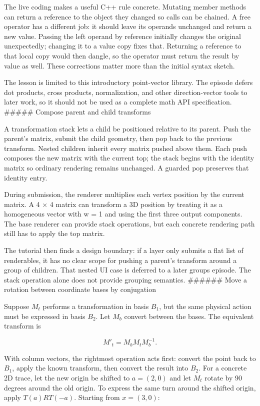 The live coding makes a useful C++ rule concrete. Mutating member methods can return a reference to the object they changed so calls can be chained. A free \BookInlineCode{+} operator has a different job: it should leave its operands unchanged and return a new value. Passing the left operand by reference initially changes the original unexpectedly; changing it to a value copy fixes that. Returning a reference to that local copy would then dangle, so the operator must return the result by value as well. These corrections matter more than the initial syntax sketch.

The lesson is limited to this introductory point-vector library. The episode defers dot products, cross products, normalization, and other direction-vector tools to later work, so it should not be used as a complete math API specification. \#\#\#\#\# Compose parent and child transforms

A transformation stack lets a child be positioned relative to its parent. Push the parent's matrix, submit the child geometry, then pop back to the previous transform. Nested children inherit every matrix pushed above them. Each push composes the new matrix with the current top; the stack begins with the identity matrix so ordinary rendering remains unchanged. A guarded pop preserves that identity entry.

During submission, the renderer multiplies each vertex position by the current matrix. A 4 × 4 matrix can transform a 3D position by treating it as a homogeneous vector with w = 1 and using the first three output components. The base renderer can provide stack operations, but each concrete rendering path still has to apply the top matrix.

The tutorial then finds a design boundary: if a layer only submits a flat list of renderables, it has no clear scope for pushing a parent's transform around a group of children. That nested UI case is deferred to a later groups episode. The stack operation alone does not provide grouping semantics. \#\#\#\#\#\# Move a rotation between coordinate bases by conjugation

Suppose \(M_t\) performs a transformation in basis \(B_1\), but the same physical action must be expressed in basis \(B_2\). Let \(M_b\) convert between the bases. The equivalent transform is

\[
M'_t=M_bM_tM_b^{-1}.
\]

With column vectors, the rightmost operation acts first: convert the point back to \(B_1\), apply the known transform, then convert the result into \(B_2\). For a concrete 2D trace, let the new origin be shifted to \(a=(2,0)\) and let \(M_t\) rotate by 90 degrees around the old origin. To express the same turn around the shifted origin, apply \(T(a)RT(-a)\). Starting from \(x=(3,0)\):

